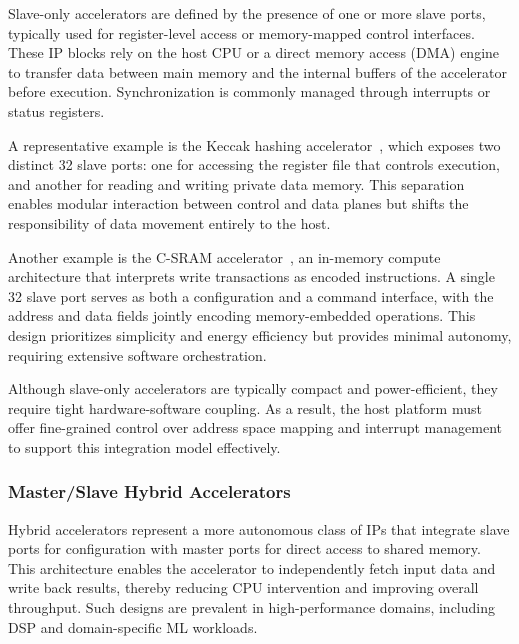                 Slave-only accelerators are defined by the presence of one or more slave ports, typically used for register-level access or memory-mapped control interfaces. These IP blocks rely on the host CPU or a direct memory access (DMA) engine to transfer data between main memory and the internal buffers of the accelerator before execution. Synchronization is commonly managed through interrupts or status registers.
                
                A representative example is the Keccak hashing accelerator~\cite{keccak}, which exposes two distinct \SI{32}{\bit} slave ports: one for accessing the register file that controls execution, and another for reading and writing private data memory. This separation enables modular interaction between control and data planes but shifts the responsibility of data movement entirely to the host.
                
                Another example is the C-SRAM accelerator~\cite{cea_imc}, an in-memory compute architecture that interprets write transactions as encoded instructions. A single \SI{32}{\bit} slave port serves as both a configuration and a command interface, with the address and data fields jointly encoding memory-embedded operations. This design prioritizes simplicity and energy efficiency but provides minimal autonomy, requiring extensive software orchestration.
                
                Although slave-only accelerators are typically compact and power-efficient, they require tight hardware-software coupling. As a result, the host platform must offer fine-grained control over address space mapping and interrupt management to support this integration model effectively.

            \vspace{-1em}
            \subsubsection*{Master/Slave Hybrid Accelerators}
            
                Hybrid accelerators represent a more autonomous class of IPs that integrate slave ports for configuration with master ports for direct access to shared memory. This architecture enables the accelerator to independently fetch input data and write back results, thereby reducing CPU intervention and improving overall throughput. Such designs are prevalent in high-performance domains, including DSP and domain-specific ML workloads.
                
